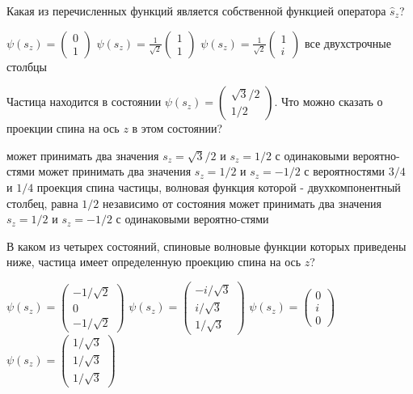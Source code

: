 \documentclass[11pt,a4paper]{exam}
\begin{document}
\begin{questions}
\question Какая из перечисленных функций является собственной функцией оператора ${\hat s_z}$?
\begin{choices}
\choice $\psi ({s_z}) = \left( {\begin{array}{*{20}{c}}
0\\
1
\end{array}} \right)$   
\choice $\psi ({s_z}) = \frac{1}{{\sqrt 2 }}\left( {\begin{array}{*{20}{c}}
1\\
1
\end{array}} \right)$   
\choice $\psi ({s_z}) = \frac{1}{{\sqrt 2 }}\left( {\begin{array}{*{20}{c}}
1\\
i
\end{array}} \right)$   
\choice все двухстрочные столбцы
\end{choices}

\question Частица находится в состоянии $\psi ({s_z}) = \left( {\begin{array}{*{20}{c}}
{\sqrt 3 /2}\\
{1/2}
\end{array}} \right)$. Что можно сказать о проекции спина на ось $z$ в этом состоянии?
\begin{choices}
\choice может принимать два значения ${s_z} = \sqrt 3 /2$ и ${s_z} = 1/2$ с одинаковыми вероятно-стями
\choice может принимать два значения ${s_z} = 1/2$ и ${s_z} =  - 1/2$ с вероятностями $3/4$ и $1/4$
\choice проекция спина частицы, волновая функция которой - двухкомпонентный столбец, равна $1/2$ независимо от состояния
\choice может принимать два значения ${s_z} = 1/2$ и ${s_z} =  - 1/2$ с одинаковыми вероятно-стями
\end{choices}

\question В каком из четырех состояний, спиновые волновые функции которых приведены ниже, частица имеет определенную проекцию спина на ось $z$?
\begin{choices}
\choice $\psi \left( {{s_z}} \right) = \left( {\begin{array}{*{20}{c}}
{ - 1/\sqrt 2 }\\
0\\
{ - 1/\sqrt 2 }
\end{array}} \right)$      
\choice $\psi \left( {{s_z}} \right) = \left( {\begin{array}{*{20}{c}}
{ - i/\sqrt 3 }\\
{i/\sqrt 3 }\\
{1/\sqrt 3 }
\end{array}} \right)$      
\choice $\psi \left( {{s_z}} \right) = \left( {\begin{array}{*{20}{c}}
0\\
i\\
0
\end{array}} \right)$   
\choice $\psi \left( {{s_z}} \right) = \left( {\begin{array}{*{20}{c}}
{1/\sqrt 3 }\\
{1/\sqrt 3 }\\
{1/\sqrt 3 }
\end{array}} \right)$
\end{choices}


\end{questions}
\end{document}
